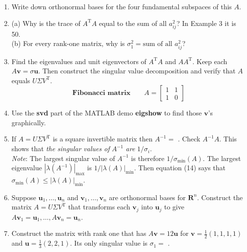 \documentclass[14pt, a4paper]{article}
\begin{document}
\begin{enumerate}
    \item Write down orthonormal bases for the four fundamental subspaces of this $A$.

    \item (a) Why is the trace of $A^{\mathrm{T}}A$ equal to the sum of all $a_{ij}^2$? In Example 3 it is 50. \\
          (b) For every rank-one matrix, why is $\sigma_1^2 = \text{sum of all } a_{ij}^2$?

    \item Find the eigenvalues and unit eigenvectors of $A^{\mathrm{T}}A$ and $AA^{\mathrm{T}}$. Keep each $A\boldsymbol{v} = \sigma\boldsymbol{u}$. Then construct the singular value decomposition and verify that $A$ equals $U\Sigma V^{\mathrm{T}}$.
          \[
              \textbf{Fibonacci matrix} \qquad A = \begin{bmatrix} 1 & 1 \\ 1 & 0 \end{bmatrix}
          \]

    \item Use the \textbf{svd} part of the MATLAB demo \textbf{eigshow} to find those $\boldsymbol{v}$'s graphically.

    \item If $A = U\Sigma V^{\mathrm{T}}$ is a square invertible matrix then $A^{-1} =$ \underline{\hspace{1cm}} \underline{\hspace{1cm}} \underline{\hspace{1cm}}. Check $A^{-1}A$. This shows that \textit{the singular values of} $A^{-1}$ \textit{are} $1/\sigma_i$. \\
          \textit{Note}: The largest singular value of $A^{-1}$ is therefore $1/\sigma_{\min}(A)$. The largest eigenvalue $|\lambda(A^{-1})|_{\max}$ is $1/|\lambda(A)|_{\min}$. Then equation (14) says that $\sigma_{\min}(A) \le |\lambda(A)|_{\min}$.

    \item Suppose $\boldsymbol{u}_1, \dots, \boldsymbol{u}_n$ and $\boldsymbol{v}_1, \dots, \boldsymbol{v}_n$ are orthonormal bases for $\mathbf{R}^n$. Construct the matrix $A = U\Sigma V^{\mathrm{T}}$ that transforms each $\boldsymbol{v}_j$ into $\boldsymbol{u}_j$ to give $A\boldsymbol{v}_1 = \boldsymbol{u}_1, \dots, A\boldsymbol{v}_n = \boldsymbol{u}_n$.

    \item Construct the matrix with rank one that has $A\boldsymbol{v} = 12\boldsymbol{u}$ for $\boldsymbol{v} = \frac{1}{2}(1, 1, 1, 1)$ and $\boldsymbol{u} = \frac{1}{3}(2, 2, 1)$. Its only singular value is $\sigma_1 =$ \underline{\hspace{1cm}}.


\end{enumerate}
\end{document}
